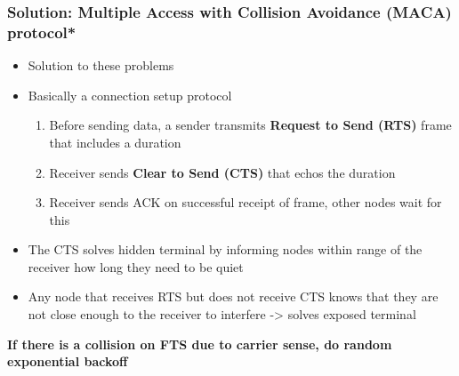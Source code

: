 \documentclass[11pt]{article}
\begin{document}
\subsubsection{Solution: Multiple Access with Collision Avoidance (MACA) protocol*}
\label{sec:orgheadline48}
\begin{itemize}
\item Solution to these problems
\item Basically a connection setup protocol
\begin{enumerate}
\item Before sending data, a sender transmits \textbf{Request to Send (RTS)}
     frame that includes a duration
\item Receiver sends \textbf{Clear to Send (CTS)} that echos the duration
\item Receiver sends ACK on successful receipt of frame, other nodes
wait for this
\end{enumerate}
\item The CTS solves hidden terminal by informing nodes within range of
the receiver how long they need to be quiet
\item Any node that receives RTS but does not receive CTS knows that they
are not close enough to the receiver to interfere -> solves exposed
terminal
\end{itemize}
\textbf{If there is a collision on FTS due to carrier sense, do random
exponential backoff} 
\end{document}

